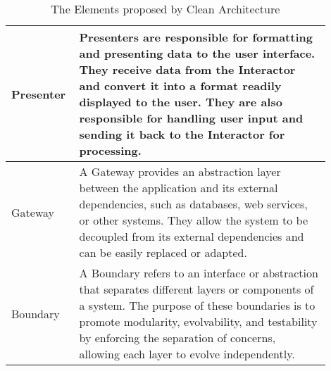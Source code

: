 \begin{table}[H]
\begin{tabular}{ p{0.15\linewidth} p{0.75\linewidth}}
        Presenter & Presenters are responsible for formatting and presenting data to the
        user interface. They receive data from the Interactor and convert it into a format
        readily displayed to the user. They are also responsible for handling user input
        and sending it back to the Interactor for processing.\\ \midrule

        Gateway & A Gateway provides an abstraction layer between the application and its
        external dependencies, such as databases, web services, or other systems. They
        allow the system to be decoupled from its external dependencies and can be easily
        replaced or adapted.\\ \midrule

        Boundary & A Boundary refers to an interface or abstraction that separates
        different layers or components of a system. The purpose of these boundaries is to
        promote modularity, evolvability, and testability by enforcing the separation of
        concerns, allowing each layer to evolve independently.\\ \midrule

        \bottomrule
    \end{tabular}
    \caption{The Elements proposed by Clean Architecture}
    \label{ca_element}
\end{table}